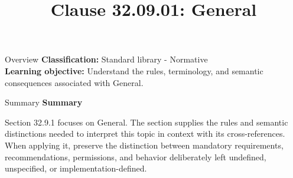 \documentclass[10pt,letterpaper]{article}
\title{Clause 32.09.01: General}
\author{}
\date{}
\begin{document}
\maketitle
\begin{CornellOverviewBox}{Overview}
\textbf{Classification:} Standard library - Normative\\[2pt]
\textbf{Learning objective:} Understand the rules, terminology, and semantic consequences associated with General.
\end{CornellOverviewBox}\begin{CornellSummaryBox}{Summary}
{\sffamily\bfseries\color{Accent} Summary}\par\vspace{3pt}Section 32.9.1 focuses on General. The section supplies the rules and semantic distinctions needed to interpret this topic in context with its cross-references. When applying it, preserve the distinction between mandatory requirements, recommendations, permissions, and behavior deliberately left undefined, unspecified, or implementation-defined.
\end{CornellSummaryBox}
\end{document}
